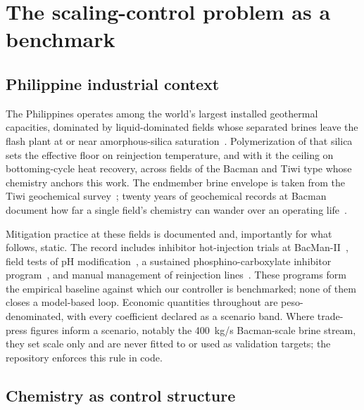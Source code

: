 \section{The scaling-control problem as a benchmark}\label{sec:benchmark}

\subsection{Philippine industrial context}\label{sec:phcontext}

The Philippines operates among the world's largest installed geothermal
capacities, dominated by liquid-dominated fields whose separated brines
leave the flash plant at or near amorphous-silica
saturation~\citep{fronda2020country}. Polymerization of that silica
sets the effective floor on reinjection temperature, and with it the
ceiling on bottoming-cycle heat recovery, across fields of the Bacman
and Tiwi type whose chemistry anchors this work. The endmember brine
envelope is taken from the Tiwi geochemical
survey~\citep{sugiaman2004geochemical}; twenty years of geochemical
records at Bacman document how far a single field's chemistry can
wander over an operating life~\citep{espartinez2015bacman}.

Mitigation practice at these fields is documented and, importantly for
what follows, static. The record includes inhibitor hot-injection
trials at BacMan-II~\citep{see2010wgc}, field tests of pH
modification~\citep{remoroza2008ph}, a sustained phosphino-carboxylate
inhibitor program~\citep{baltazar2014grc}, and manual management of
reinjection lines~\citep{kobayashi2024mahanagdong}. These programs form
the empirical baseline against which our controller is benchmarked;
none of them closes a model-based loop. Economic quantities throughout
are peso-denominated, with every coefficient declared as a scenario
band. Where trade-press figures inform a scenario, notably the
400~kg/s Bacman-scale brine stream, they set scale only and are never
fitted to or used as validation targets; the repository enforces this
rule in code.

\subsection{Chemistry as control structure}\label{sec:chemistry}

